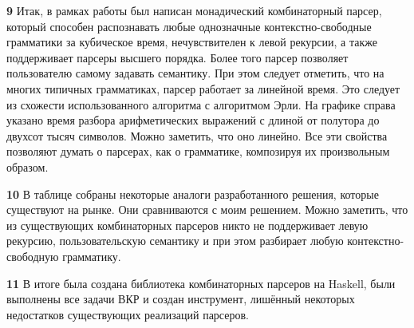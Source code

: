 \documentclass[times]{itmo-student-thesis}
\begin{document}
\textbf{9} Итак, в рамках работы был написан монадический комбинаторный парсер, который способен
распознавать любые однозначные контекстно-свободные грамматики за кубическое время, нечувствителен к левой рекурсии, а
также поддерживает парсеры высшего порядка. Более того парсер позволяет пользователю самому задавать семантику. При
этом следует отметить, что на многих типичных грамматиках, парсер работает за линейной время. Это следует из схожести
использованного алгоритма с алгоритмом Эрли. На графике справа указано время разбора арифметических выражений с длиной
от полутора до двухсот тысяч символов. Можно заметить, что оно линейно. Все эти свойства позволяют думать о парсерах,
как о грамматике, композируя их произвольным образом.

\textbf{10} В таблице собраны некоторые аналоги разработанного решения, которые существуют на рынке. Они сравниваются с 
моим решением. Можно заметить, что из существующих комбинаторных парсеров никто не поддерживает левую рекурсию,
пользовательскую семантику и при этом разбирает любую контекстно-свободную грамматику.

\textbf{11} В итоге была создана библиотека комбинаторных парсеров на Haskell, были выполнены все задачи ВКР и создан
инструмент, лишённый некоторых недостатков существующих реализаций парсеров.
\end{document}
